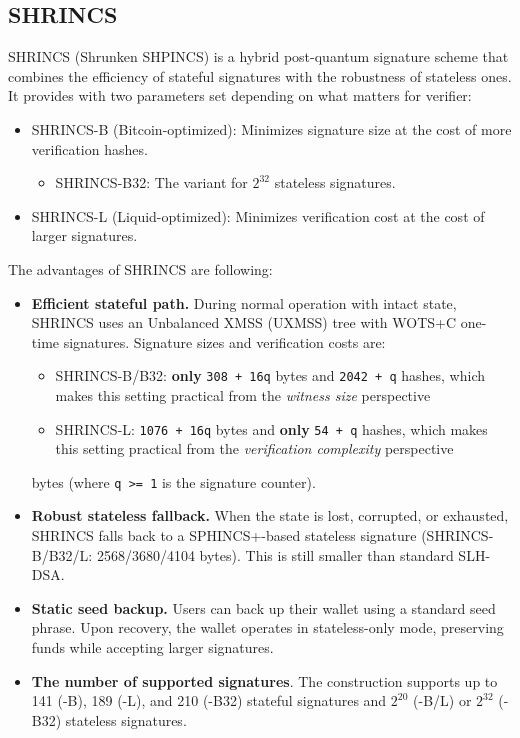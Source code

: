 \subsection{SHRINCS} 
SHRINCS (Shrunken SHPINCS) is a hybrid post-quantum signature scheme that combines the efficiency of stateful signatures with the robustness of stateless ones. It provides with two parameters set depending on what matters for verifier:
    \begin{itemize}
        \item SHRINCS-B (Bitcoin-optimized): Minimizes signature size at the cost of more verification hashes.
        \begin{itemize}
            \item SHRINCS-B32: The variant for $2^{32}$ stateless signatures.
        \end{itemize}
        \item SHRINCS-L (Liquid-optimized): Minimizes verification cost at the cost of larger signatures.
    \end{itemize}
The advantages of SHRINCS are following: 
\begin{itemize}
    \item \textbf{Efficient stateful path.} During normal operation with intact state, SHRINCS uses an Unbalanced XMSS (UXMSS) tree with WOTS+C one-time signatures. Signature sizes and verification costs are:
    \begin{itemize}
        \item SHRINCS-B/B32: \textbf{only} \texttt{308 + 16q} bytes and \texttt{2042 + q} hashes, which makes this setting practical from the \textit{witness size} perspective
        \item SHRINCS-L: \texttt{1076 + 16q} bytes and \textbf{only} \texttt{54 + q} hashes, which makes this setting practical from the \textit{verification complexity} perspective
    \end{itemize} 
    bytes (where \texttt{q >= 1} is the signature counter).
    \item \textbf{Robust stateless fallback.} When the state is lost, corrupted, or exhausted, SHRINCS falls back to a SPHINCS+-based stateless signature (SHRINCS-B/B32/L: 2568/3680/4104 bytes). This is still smaller than standard SLH-DSA.
    \item \textbf{Static seed backup.} Users can back up their wallet using a standard seed phrase. Upon recovery, the wallet operates in stateless-only mode, preserving funds while accepting larger signatures.
    \item \textbf{The number of supported signatures}. The construction supports up to 141 (-B), 189 (-L), and 210 (-B32) stateful signatures and $2^{20}$ (-B/L) or $2^{32}$ (-B32) stateless signatures.
\end{itemize}

